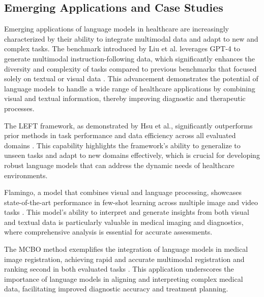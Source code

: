 \subsection{Emerging Applications and Case Studies} \label{subsec:Emerging Applications and Case Studies}



Emerging applications of language models in healthcare are increasingly characterized by their ability to integrate multimodal data and adapt to new and complex tasks. The benchmark introduced by Liu et al. leverages GPT-4 to generate multimodal instruction-following data, which significantly enhances the diversity and complexity of tasks compared to previous benchmarks that focused solely on textual or visual data \cite{liu2024visual}. This advancement demonstrates the potential of language models to handle a wide range of healthcare applications by combining visual and textual information, thereby improving diagnostic and therapeutic processes.



The LEFT framework, as demonstrated by Hsu et al., significantly outperforms prior methods in task performance and data efficiency across all evaluated domains \cite{hsu2023whatsleftconceptgrounding}. This capability highlights the framework's ability to generalize to unseen tasks and adapt to new domains effectively, which is crucial for developing robust language models that can address the dynamic needs of healthcare environments.



Flamingo, a model that combines visual and language processing, showcases state-of-the-art performance in few-shot learning across multiple image and video tasks \cite{alayrac2022flamingo}. This model's ability to interpret and generate insights from both visual and textual data is particularly valuable in medical imaging and diagnostics, where comprehensive analysis is essential for accurate assessments.



The MCBO method exemplifies the integration of language models in medical image registration, achieving rapid and accurate multimodal registration and ranking second in both evaluated tasks \cite{wang2024unsupervisedmultimodal3dmedical}. This application underscores the importance of language models in aligning and interpreting complex medical data, facilitating improved diagnostic accuracy and treatment planning.



